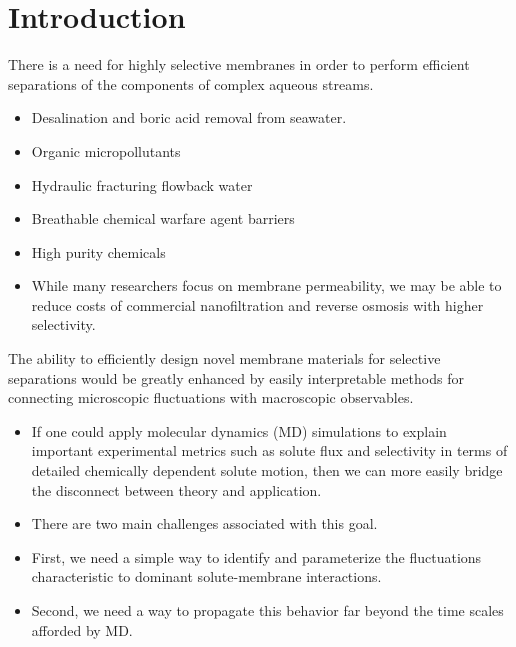 \documentclass[journal=jpcbfk,manuscript=article]{achemso}
\begin{document}
  
  \section{Introduction}
  
  There is a need for highly selective membranes in order to perform efficient 
  separations of the components of complex aqueous streams.
  \begin{itemize}
    \item Desalination and boric acid removal from seawater.
    \item Organic micropollutants
    \item Hydraulic fracturing flowback water
    \item Breathable chemical warfare agent barriers
    \item High purity chemicals
    \item While many researchers focus on membrane permeability, we may be 
    able to reduce costs of commercial nanofiltration and reverse osmosis with
    higher selectivity.~\cite{werber_materials_2016}
  \end{itemize}
  
  The ability to efficiently design novel membrane materials for selective separations would be 
  greatly enhanced by easily interpretable methods for connecting microscopic fluctuations
  with macroscopic observables.
  \begin{itemize}
  	\item If one could apply molecular dynamics (MD) simulations to explain important
  	experimental metrics such as solute flux and selectivity in terms of detailed 
  	chemically dependent solute motion, then we can more easily bridge the disconnect
  	between theory and application.
  	\item There are two main challenges associated with this goal.
  	\item First, we need a simple way to identify and parameterize the fluctuations
  	characteristic to dominant solute-membrane interactions.
  	\item Second, we need a way to propagate this behavior far beyond the time scales
  	afforded by MD.
  \end{itemize}
  
\end{document}
